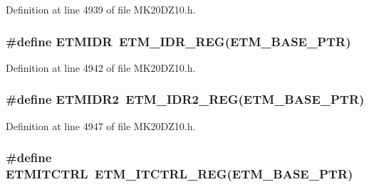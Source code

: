 Definition at line 4939 of file M\+K20\+D\+Z10.\+h.

\subsubsection[{\texorpdfstring{E\+T\+M\+I\+DR}{ETMIDR}}]{\setlength{\rightskip}{0pt plus 5cm}\#define E\+T\+M\+I\+DR~{\bf E\+T\+M\+\_\+\+I\+D\+R\+\_\+\+R\+EG}({\bf E\+T\+M\+\_\+\+B\+A\+S\+E\+\_\+\+P\+TR})}\hypertarget{group___e_t_m___register___accessor___macros_ga2dccd294d771770c33d18724439fa52b}{}\label{group___e_t_m___register___accessor___macros_ga2dccd294d771770c33d18724439fa52b}


Definition at line 4942 of file M\+K20\+D\+Z10.\+h.

\subsubsection[{\texorpdfstring{E\+T\+M\+I\+D\+R2}{ETMIDR2}}]{\setlength{\rightskip}{0pt plus 5cm}\#define E\+T\+M\+I\+D\+R2~{\bf E\+T\+M\+\_\+\+I\+D\+R2\+\_\+\+R\+EG}({\bf E\+T\+M\+\_\+\+B\+A\+S\+E\+\_\+\+P\+TR})}\hypertarget{group___e_t_m___register___accessor___macros_ga9c9532d81c5e74500dea54ff97f5d799}{}\label{group___e_t_m___register___accessor___macros_ga9c9532d81c5e74500dea54ff97f5d799}


Definition at line 4947 of file M\+K20\+D\+Z10.\+h.

\subsubsection[{\texorpdfstring{E\+T\+M\+I\+T\+C\+T\+RL}{ETMITCTRL}}]{\setlength{\rightskip}{0pt plus 5cm}\#define E\+T\+M\+I\+T\+C\+T\+RL~{\bf E\+T\+M\+\_\+\+I\+T\+C\+T\+R\+L\+\_\+\+R\+EG}({\bf E\+T\+M\+\_\+\+B\+A\+S\+E\+\_\+\+P\+TR})}\hypertarget{group___e_t_m___register___accessor___macros_ga1889ed16790019f91a9a1521addf636e}{}\label{group___e_t_m___register___accessor___macros_ga1889ed16790019f91a9a1521addf636e}



